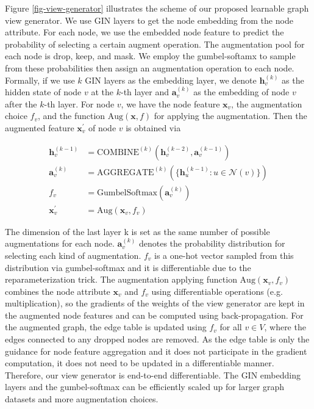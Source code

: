 Figure \ref{fig-view-generator} illustrates the scheme of our proposed learnable graph view generator. We use GIN \cite{xu2018gin} layers to get the node embedding from the node attribute. For each node, we use the embedded node feature to predict the probability of selecting a certain augment operation. The augmentation pool for each node is drop, keep, and mask. We employ the gumbel-softamx \cite{jang2016gumbelsoftmax} to sample from these probabilities then assign an augmentation operation to each node. Formally, if we use $k$ GIN layers as the embedding layer, we denote $\boldsymbol{h}_v^{(k)}$ as the hidden state of node $v$ at the $k$-th layer and $\boldsymbol{a}_v^{(k)}$ as the embedding of node $v$ after the $k$-th layer. For node $v$, we have the node feature $\boldsymbol{x}_v $, the augmentation choice $f_v$, and the function $\text{Aug}(\boldsymbol{x}, f)$ for applying the augmentation. Then the augmented feature $\boldsymbol{x}_v^{'}$ of node $v$ is obtained via
\begin{small}
    \begin{align}
        \boldsymbol{h}_v^{(k-1)} &= \text{COMBINE}^{(k)} ( \boldsymbol{h}_v^{(k-2)}, \boldsymbol{a}_v^{(k-1)} ) \\
        \boldsymbol{a}_v^{(k)} &= \text{AGGREGATE}^{(k)}  ( \{ \boldsymbol{h}_u^{(k-1)} : u \in \mathcal{N}(v) \} ) \\
        f_v &= \text{GumbelSoftmax} ( \boldsymbol{a}_v^{(k)} ) \\
        \boldsymbol{x}_v^{'} &=  \text{Aug}(\boldsymbol{x}_v, f_v)
    \end{align}
\end{small}
The dimension of the last layer k is set as the same number of possible augmentations for each node. $\boldsymbol{a}_v^{(k)}$ denotes the probability distribution for selecting each kind of augmentation. $f_v$ is a one-hot vector sampled from this distribution via gumbel-softmax and it is differentiable due to the reparameterization trick. The augmentation applying function $\text{Aug}(\boldsymbol{x}_v, f_v)$ combines the node attribute $\boldsymbol{x}_v$ and $f_v$ using differentiable operations (e.g. multiplication), so the gradients of the weights of the view generator are kept in the augmented node features and can be computed using back-propagation. For the augmented graph, the edge table is updated using $f_v$ for all $v\in V$, where the edges connected to any dropped nodes are removed. As the edge table is only the guidance for node feature aggregation and it does not participate in the gradient computation, it does not need to be updated in a differentiable manner. Therefore, our view generator is end-to-end differentiable. The GIN embedding layers and the gumbel-softmax can be efficiently scaled up for larger graph datasets and more augmentation choices.

